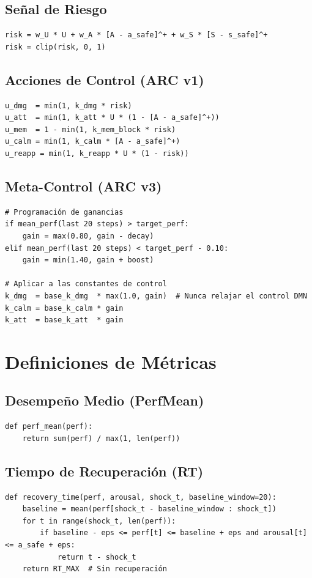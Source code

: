 \documentclass{article}
\begin{document}
\subsection{Señal de Riesgo}

\begin{verbatim}
risk = w_U * U + w_A * [A - a_safe]^+ + w_S * [S - s_safe]^+
risk = clip(risk, 0, 1)
\end{verbatim}

\subsection{Acciones de Control (ARC v1)}

\begin{verbatim}
u_dmg  = min(1, k_dmg * risk)
u_att  = min(1, k_att * U * (1 - [A - a_safe]^+))
u_mem  = 1 - min(1, k_mem_block * risk)
u_calm = min(1, k_calm * [A - a_safe]^+)
u_reapp = min(1, k_reapp * U * (1 - risk))
\end{verbatim}

\subsection{Meta-Control (ARC v3)}

\begin{verbatim}
# Programación de ganancias
if mean_perf(last 20 steps) > target_perf:
    gain = max(0.80, gain - decay)
elif mean_perf(last 20 steps) < target_perf - 0.10:
    gain = min(1.40, gain + boost)

# Aplicar a las constantes de control
k_dmg  = base_k_dmg  * max(1.0, gain)  # Nunca relajar el control DMN
k_calm = base_k_calm * gain
k_att  = base_k_att  * gain
\end{verbatim}

\section{Definiciones de Métricas}

\subsection{Desempeño Medio (PerfMean)}
\begin{verbatim}
def perf_mean(perf):
    return sum(perf) / max(1, len(perf))
\end{verbatim}

\subsection{Tiempo de Recuperación (RT)}
\begin{verbatim}
def recovery_time(perf, arousal, shock_t, baseline_window=20):
    baseline = mean(perf[shock_t - baseline_window : shock_t])
    for t in range(shock_t, len(perf)):
        if baseline - eps <= perf[t] <= baseline + eps and arousal[t] <= a_safe + eps:
            return t - shock_t
    return RT_MAX  # Sin recuperación
\end{verbatim}
\end{document}
